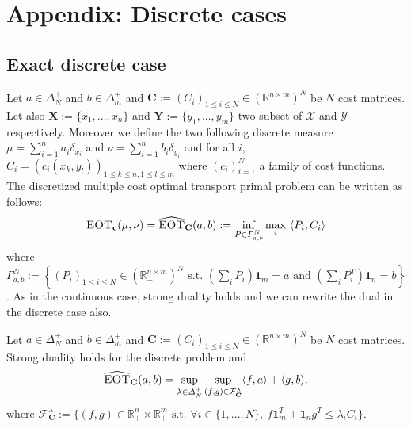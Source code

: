 \section{Appendix: Discrete cases}
\subsection{Exact discrete case}
\label{dis:exact}

Let $a\in\Delta_N^{+}$ and $b\in\Delta^+_m$ and $\mathbf{C}:=(C_i)_{1\leq i\leq N}\in\left(\mathbb{R}^{n\times m}\right)^N$ be $N$ cost matrices. Let also $\mathbf{X}:=\{x_1,...,x_n\}$ and $\mathbf{Y}:=\{y_1,...,y_m\}$ two subset of $\mathcal{X}$ and $\mathcal{Y}$ respectively. Moreover we define the two following discrete measure $\mu=\sum_{i=1}^n a_i \delta_{x_i}$ and $\nu=\sum_{i=1}^n b_i \delta_{y_i}$ and for all $i$, $C_i = (c_i(x_k,y_l))_{1\leq k\leq n,1\leq l\leq m}$ where $(c_i)_{i=1}^N$ a family of cost functions. The discretized multiple cost optimal transport primal problem can be written as follows:
\begin{align*}
\textsc{EOT}_{\mathbf{c}}(\mu,\nu)=\widehat{\textsc{EOT}}_{\textbf{C}}(a,b) := \inf_{P\in\Gamma_{a,b}^N} \max_i~\langle P_i,C_i\rangle
\end{align*}
where $\Gamma_{a,b}^N:=\left\{(P_i)_{1\leq i\leq N}\in\left(\mathbb{R}_+^{n\times m}\right)^N\text{ s.t. } (\sum_i P_i)\mathbf{1}_m=a \text{ and } (\sum_i P_i^T)\mathbf{1}_n=b \right\}$. 
As in the continuous case, strong duality holds and we can rewrite the dual in the discrete case also.
\begin{prop}
\label{prop:discrete-dual}

Let $a\in\Delta_N^{+}$ and $b\in\Delta^+_m$ and $\mathbf{C}:=(C_i)_{1\leq i\leq N}\in\left(\mathbb{R}^{n\times m}\right)^N$ be $N$ cost matrices. Strong duality holds for the discrete problem and
\begin{align*}
\widehat{\textsc{EOT}}_{\mathbf{C}}(a,b)=\sup_{\lambda\in\Delta^+_N}\sup\limits_{(f,g)\in\mathcal{F}^{\lambda}_{\mathbf{C}}} \langle f,a\rangle+\langle g,b\rangle.
\end{align*}
where $\mathcal{F}^{\lambda}_{\mathbf{C}}:=\{(f,g)\in\mathbb{R}_{+}^n\times\mathbb{R}_{+}^m\text{ s.t. }\forall i\in\{1,...,N\},~ f\mathbf{1}_m^T+\mathbf{1}_n g^T\leq\lambda_i C_i\}$.
\end{prop}




